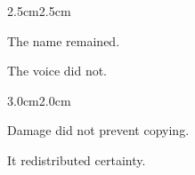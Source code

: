\begin{center}
\end{center}

\vspace{1em}

\begin{center}
\cheiro{\phantom{nothing}}
\end{center}

\vspace{1em}

\begin{center}
\end{center}

\vspace{3em}

\begin{adjustwidth}{2.5cm}{2.5cm}

The name remained.

\medskip

The voice did not.

\vspace{3em}

\end{adjustwidth}

\begin{center}
\end{center}

\vspace{2em}

\begin{adjustwidth}{3.0cm}{2.0cm}

Damage did not prevent copying.

\medskip

It redistributed certainty.

\vspace{3em}

\end{adjustwidth}

\begin{center}

\smallskip


\smallskip

\end{center}

